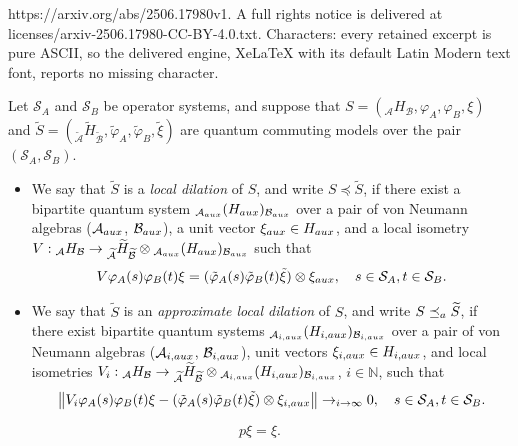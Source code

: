 \documentclass[10pt,a4paper]{amsart}
\newcommand{\bb}[1]{\mathbb{#1}}
\newcommand{\cl}[1]{\mathcal{#1}}
\providecommand{\wt}[1]{\widetilde{#1}}
\begin{document}
https://arxiv.org/abs/2506.17980v1. A full rights notice is delivered at licenses/arxiv-2506.17980-CC-BY-4.0.txt. Characters: every retained excerpt is pure ASCII, so the delivered engine, XeLaTeX with its default Latin Modern text font, reports no missing character.
\begin{defn}\label{d_appdil}
Let $\cl S_A$ and $\cl S_B$ be operator systems, and 
suppose that 
$S = (_{\cl A}H_{\cl B}, \varphi_A, \varphi_B, \xi)$  and 
$\wt{S} = (_{\wt{\cl A}}\wt{H}_{\wt{\cl B}}, \wt{\varphi}_A, \wt{\varphi}_B, \wt{\xi})$ are quantum commuting models over the pair $(\cl S_A,\cl S_B)$.

\begin{itemize}
\item[(i)] We say that $\wt{S}$
is a \emph{local dilation} of $S$, and write $S\preceq \wt{S}$, 
if there exist a bipartite quantum system 
$_{{\cl A}_{\rm aux}}(H_{\rm aux})_{{\cl B}_{\rm aux}}$ 
over a pair of von Neumann algebras (${\cl A}_{\rm aux}$, ${\cl B}_{\rm aux}$), a unit vector $\xi_{\rm aux}\in H_{\rm aux}$, and
a local isometry $V : \mbox{}_{\cl A}H_{\cl B}\to
\mbox{}_{\wt{\cl A}}\wt{H}_{\wt{\cl B}}\otimes
\mbox{}_{{\cl A}_{\rm aux}}(H_{\rm aux})_{{\cl B}_{\rm aux}}$ such that 
\begin{equation}\label{eq_TAB}
V\varphi_A(s) \varphi_B(t)\xi = (\tilde\varphi_A(s)\tilde\varphi_B(t)\tilde\xi) \otimes\xi_{\rm aux}, \ \ \ s\in \cl S_A, t\in\cl S_B.
\end{equation}

\item[(ii)] 
We say that $\wt{S}$
is an \emph{approximate local dilation} of $S$, and write $S\preceq_{\rm a} \wt{S}$, 
if there exist bipartite quantum systems
$_{{\cl A}_{i,\rm aux}}(H_{i,\rm aux})_{{\cl B}_{i,\rm aux}}$ 
over a pair of von Neumann algebras (${\cl A}_{i,\rm aux}$, ${\cl B}_{i,\rm aux}$), 
unit vectors $\xi_{i,\rm aux}\in H_{i,\rm aux}$, and
local isometries $V_i : \mbox{}_{\cl A}H_{\cl B}\to
\mbox{}_{\wt{\cl A}}\wt{H}_{\wt{\cl B}}\otimes
\mbox{}_{{\cl A}_{i,\rm aux}}(H_{i,\rm aux})_{{\cl B}_{i,\rm aux}}$, 
$i\in \bb{N}$, such that 
\begin{equation}\label{eq_TABa}
\left\|V_i\varphi_A(s) \varphi_B(t)\xi - (\tilde\varphi_A(s)\tilde\varphi_B(t)\tilde\xi) \otimes\xi_{i,\rm aux}\right\|\to_{i\to \infty} 0, \ \ \ s\in \cl S_A, t\in\cl S_B.
\end{equation}
\end{itemize}
\end{defn}

\begin{equation}\label{eq_supre}
p\xi = \xi.
\end{equation} 
\end{document}

